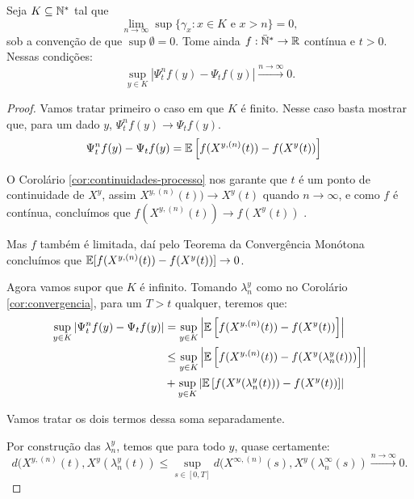 \begin{proposicao}
  \label{prop:convergencia-semigrupo}
  Seja $K \subseteq {\mathbb{N^*}}$ tal que
  \begin{displaymath}
    \lim_{n \to \infty} \sup\{ \gamma_x: x \in  K \textrm{ e } x > n\} = 0,
  \end{displaymath}
  sob a convenção de que $\sup \emptyset = 0$. Tome ainda $f: {\mathbb{\bar{N}^*}}
  \to {\mathbb{R}}$ contínua e $t > 0$. Nessas condições:
  \begin{displaymath}
    \sup_{y \in K} | \Psi^n_t f (y) - \Psi_t f(y) |
    \xrightarrow{n\to\infty} 0.
  \end{displaymath}
\end{proposicao}

\begin{proof}

  Vamos tratar primeiro o caso em que $K$ é finito. Nesse caso basta
  mostrar que, para um dado $y$,  $\Psi^n_t f (y) \to \Psi_t f(y)$.
  \begin{align*}
    \Psi^n_t f (y) -\Psi_t f(y) &=
    {\mathbb{E}} \left[
      f(X^{y, (n)}(t)) - f(X^y(t))
    \right]
  \end{align*}

  O Corolário \ref{cor:continuidades-processo} nos garante que $t$ é
  \qc um ponto de continuidade de $X^y$, assim $X^{y, (n)}(t)) \to
  X^y(t)$ \qc quando $n \to \infty$, e como $f$ é contínua, concluímos
  que $f(X^{y, (n)}(t)) \to f(X^y(t))$ \qc.

  Mas $f$ também é limitada, daí pelo Teorema da Convergência Monótona
  concluímos que  ${\mathbb{E}} [ f(X^{y, (n)}(t)) - f(X^y(t)) ] \to 0$.


  Agora vamos supor que $K$ é infinito. Tomando $\lambda_n^y$ como no
  Corolário \ref{cor:convergencia}, para um $T > t$ qualquer, teremos que:
  \begin{align}
    \label{eq:esperancas-markov}
    \sup_{y \in K} | \Psi^n_t f (y) - \Psi_t f(y) | 
    &= \sup_{y \in K} \left\lvert {\mathbb{E}} \left[f(X^{y, (n)}(t)) -
        f(X^y(t)) \right]\right\rvert \\
    &\leq \sup_{y\in K}\left\lvert {\mathbb{E}} \left[f(X^{y, (n)}(t)) -
        f(X^y(\lambda_n^y(t))) \right]
    \right\rvert \notag \\
    &+ \sup_{y\in K}\left\lvert {\mathbb{E}} \left[f(X^y(\lambda_n^y(t))) -
        f(X^y(t)) \right] \right\rvert \notag
  \end{align}

  Vamos tratar os dois termos dessa soma separadamente.

  Por construção das $\lambda_n^y$, temos que para todo $y$, quase certamente:
  \begin{displaymath}
    d(X^{y, (n)}(t), X^y(\lambda_n^y(t)) \leq
    \sup_{s \in [0, T]} d(X^{\infty, (n)}(s), X^y(\lambda_n^\infty(s))
    \xrightarrow{n\to\infty} 0.
  \end{displaymath}


\end{proof}
